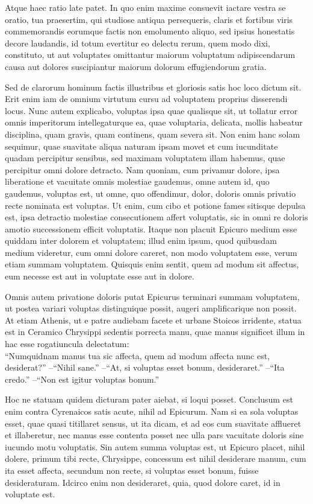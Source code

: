 Atque haec ratio late patet. In quo enim maxime consuevit iactare vestra se oratio, tua praesertim, qui studiose antiqua persequeris, claris et fortibus viris commemorandis eorumque factis non emolumento aliquo, sed ipsius honestatis decore laudandis, id totum evertitur eo delectu rerum, quem modo dixi, constituto, ut aut voluptates omittantur maiorum voluptatum adipiscendarum causa aut dolores suscipiantur maiorum dolorum effugiendorum gratia.


Sed de clarorum hominum factis illustribus et gloriosis satis hoc loco dictum sit.
Erit enim iam de omnium virtutum cursu ad voluptatem proprius disserendi locus.
Nunc autem explicabo, voluptas ipsa quae qualisque sit, ut tollatur error omnis imperitorum intellegaturque ea, quae voluptaria, delicata, mollis habeatur disciplina, quam gravis, quam continens, quam severa sit.
Non enim hanc solam sequimur, quae suavitate aliqua naturam ipsam movet et cum iucunditate quadam percipitur sensibus, sed maximam voluptatem illam habemus, quae percipitur omni dolore detracto.
%
Nam quoniam, cum privamur dolore, ipsa liberatione et vacuitate omnis molestiae gaudemus, omne autem id, quo gaudemus, voluptas est, ut omne, quo offendimur, dolor, doloris omnis privatio recte nominata est voluptas.
Ut enim, cum cibo et potione fames sitisque depulsa est, ipsa detractio molestiae consecutionem affert voluptatis, sic in omni re doloris amotio successionem efficit voluptatis.
%
Itaque non placuit Epicuro medium esse quiddam inter dolorem et voluptatem; illud enim ipsum, quod quibusdam medium videretur, cum omni dolore careret, non modo voluptatem esse, verum etiam summam voluptatem.
Quisquis enim sentit, quem ad modum sit affectus, eum necesse est aut in voluptate esse aut in dolore.

Omnis autem privatione doloris putat Epicurus terminari summam voluptatem, ut postea variari voluptas distinguique possit, augeri amplificarique non possit.
At etiam Athenis, ut e patre audiebam facete et urbane Stoicos irridente, statua est in Ceramico Chrysippi sedentis porrecta manu, quae manus significet illum in hac esse rogatiuncula delectatum:\\
``Numquidnam manus tua sic affecta, quem ad modum affecta nunc est, desiderat?''
--``Nihil sane.''
--``At, si voluptas esset bonum, desideraret.''
--``Ita credo.''
--``Non est igitur voluptas bonum.''

Hoc ne statuam quidem dicturam pater aiebat, si loqui posset.
Conclusum est enim contra Cyrenaicos satis acute, nihil ad Epicurum.
Nam si ea sola voluptas esset, quae quasi titillaret sensus, ut ita dicam, et ad eos cum suavitate afflueret et illaberetur, nec manus esse contenta posset nec ulla pars vacuitate doloris sine iucundo motu voluptatis.
Sin autem summa voluptas est, ut Epicuro placet, nihil dolere, primum tibi recte, Chrysippe, concessum est nihil desiderare manum, cum ita esset affecta, secundum non recte, si voluptas esset bonum, fuisse desideraturam.
%
Idcirco enim non desideraret, quia, quod dolore caret, id in voluptate est.


